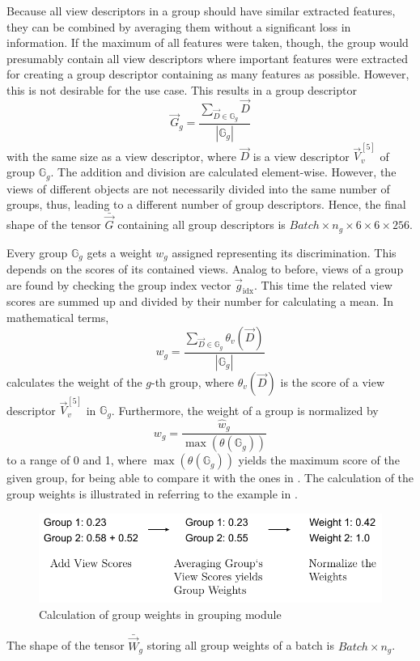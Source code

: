 Because all view descriptors in a group should have similar extracted features, they can be combined by averaging them without a significant loss in information.
If the maximum of all features were taken, though, the group would presumably contain all view descriptors where important features were extracted for creating a group descriptor containing as many features as possible.
However, this is not desirable for the use case.
This results in a group descriptor
\begin{equation}
	\vec{G}_g = \frac{\sum_{\vec{D} \in \mathbb{G}_g} \vec{D}}{|\mathbb{G}_g|}
\end{equation}
with the same size as a view descriptor, where $\vec{D}$ is a view descriptor $\vec{V}_v^{[5]}$ of group $\mathbb{G}_g$.
The addition and division are calculated element-wise.
However, the views of different objects are not necessarily divided into the same number of groups, thus, leading to a different number of group descriptors.
Hence, the final shape of the tensor $\bar{\vec{G}}$ containing all group descriptors is $Batch \times n_g \times 6 \times 6 \times 256$.

Every group $\mathbb{G}_g$ gets a weight $w_g$ assigned representing its discrimination.
This depends on the scores of its contained views.
Analog to before, views of a group are found by checking the group index vector $\vec{g}_{\text{idx}}$.
This time the related view scores are summed up and divided by their number for calculating a mean.
In mathematical terms,
\begin{equation}
	{w}_g = \frac{\sum_{\vec{D} \in \mathbb{G}_g} \theta_v(\vec{D})}{|\mathbb{G}_g|}
\end{equation}
calculates the weight of the $g$-th group, where $\theta_v(\vec{D})$ is the score of a view descriptor $\vec{V}_v^{[5]}$ in $\mathbb{G}_g$.
Furthermore, the weight of a group is normalized by
\begin{equation}
	w_g = \frac{\hat{w}_g}{\max(\theta(\mathbb{G}_g))}
\end{equation}
to a range of 0 and 1, where $\max(\theta(\mathbb{G}_g))$ yields the maximum score of the given group, for being able to compare it with the ones in \cite{Feng2018}.
The calculation of the group weights is illustrated in  referring to the example in .
\begin{figure}
	\centering
	\includegraphics[]{images/grouping_module_weights.pdf}
	\caption{Calculation of group weights in grouping module}
	\label{fig:grouping-module-weights}
\end{figure}
The shape of the tensor $\bar{\vec{W}}_g$ storing all group weights of a batch is $Batch \times n_g$.